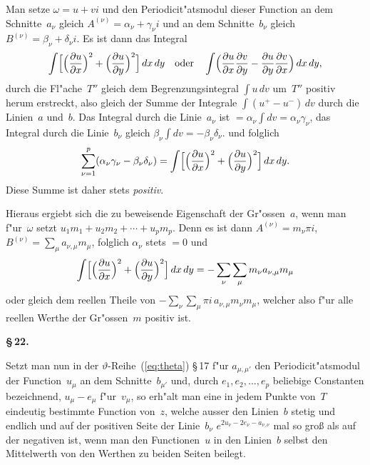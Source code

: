 \documentclass[12pt,a4paper]{article}
\begin{document}
Man setze $\omega = u + vi$ und den Periodicit"atsmodul dieser Function
an dem Schnitte~$a_\nu$ gleich $A^{(\nu)} = \alpha_\nu + \gamma_\nu i$ und an dem
Schnitte~$b_\nu$ gleich $B^{(\nu)} = \beta_\nu + \delta_\nu i$.
Es ist dann das Integral
\[
\int\Bigl[\Bigl(\frac{\partial u}{\partial x}\Bigr)^2
  + \Bigl(\frac{\partial u}{\partial y}\Bigr)^2\Bigr]\, dx\,dy
\quad\text{oder}\quad
\int\Bigl(\frac{\partial u}{\partial x}\frac{\partial v}{\partial y}
  - \frac{\partial u}{\partial y}\frac{\partial v}{\partial x}\Bigr)\, dx\,dy,
\]
durch die Fl"ache~$T''$ gleich dem Begrenzungsintegral $\int u\,dv$
um~$T''$ positiv herum erstreckt, also gleich der Summe der Integrale
$\int (u^+ - u^-)\, dv$ durch die Linien~$a$ und~$b$. Das Integral durch
die Linie~$a_\nu$ ist $= \alpha_\nu \int dv = \alpha_\nu \gamma_\nu$, das Integral durch
die Linie~$b_\nu$ gleich $\beta_\nu \int dv = -\beta_\nu \delta_\nu$.
und folglich
\[
\sum_{\nu=1}^{p} (\alpha_\nu \gamma_\nu - \beta_\nu \delta_\nu)
  = \int\Bigl[\Bigl(\frac{\partial u}{\partial x}\Bigr)^2
    + \Bigl(\frac{\partial u}{\partial y}\Bigr)^2\Bigr]\, dx\,dy.
\]
Diese Summe ist daher stets \emph{positiv}.

Hieraus ergiebt sich die zu beweisende Eigenschaft der Gr"ossen~$a$,
wenn man f"ur~$\omega$ setzt $u_1 m_1 + u_2 m_2 + \cdots + u_p m_p$. Denn es ist
dann $A^{(\nu)} = m_\nu \pi i$, $B^{(\nu)} = \sum_\mu a_{\nu,\mu} m_\mu$, folglich
$\alpha_\nu$ stets $= 0$ und
\[
\int\Bigl[\Bigl(\frac{\partial u}{\partial x}\Bigr)^2
  + \Bigl(\frac{\partial u}{\partial y}\Bigr)^2\Bigr]\, dx\,dy
= -\sum_\nu \sum_\mu m_\nu a_{\nu,\mu} m_\mu
\]
oder gleich dem reellen Theile von $-\sum_\nu \sum_\mu \pi i\, a_{\nu,\mu} m_\nu m_\mu$,
welcher also f"ur alle reellen Werthe der Gr"ossen~$m$ positiv ist.

\medskip
\textbf{\S\,22.}

Setzt man nun in der $\vartheta$-Reihe~(\ref{eq:theta}) \S\,17 f"ur
$a_{\mu,\mu'}$ den Periodicit"atsmodul der Function~$u_\mu$ an dem Schnitte~$b_{\mu'}$
und, durch $e_1, e_2, \ldots, e_p$ beliebige Constanten bezeichnend,
$u_\mu - e_\mu$ f"ur~$v_\mu$, so erh"alt man eine in jedem Punkte von~$T$
eindeutig bestimmte Function von~$z$, welche ausser den Linien~$b$ stetig
und endlich und auf der positiven Seite der Linie~$b_\nu$
$e^{2u_\nu - 2e_\nu - a_{\nu,\nu}}$ mal so gro\ss{} als auf der negativen ist, wenn man
den Functionen~$u$ in den Linien~$b$ selbst den Mittelwerth von den
Werthen zu beiden Seiten beilegt.
\end{document}
